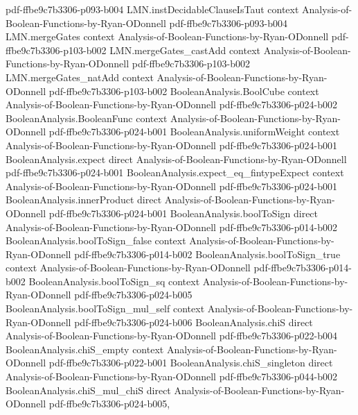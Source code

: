\begin{lemma}
  {pdf-ffbe9c7b3306-p093-b004}
\proofstep
  {LMN.instDecidableClauseIsTaut}
  {context}
  {Analysis-of-Boolean-Functions-by-Ryan-ODonnell}
  {pdf-ffbe9c7b3306-p093-b004}
\proofstep
  {LMN.mergeGates}
  {context}
  {Analysis-of-Boolean-Functions-by-Ryan-ODonnell}
  {pdf-ffbe9c7b3306-p103-b002}
\proofstep
  {LMN.mergeGates_castAdd}
  {context}
  {Analysis-of-Boolean-Functions-by-Ryan-ODonnell}
  {pdf-ffbe9c7b3306-p103-b002}
\proofstep
  {LMN.mergeGates_natAdd}
  {context}
  {Analysis-of-Boolean-Functions-by-Ryan-ODonnell}
  {pdf-ffbe9c7b3306-p103-b002}
\proofstep
  {BooleanAnalysis.BoolCube}
  {context}
  {Analysis-of-Boolean-Functions-by-Ryan-ODonnell}
  {pdf-ffbe9c7b3306-p024-b002}
\proofstep
  {BooleanAnalysis.BooleanFunc}
  {context}
  {Analysis-of-Boolean-Functions-by-Ryan-ODonnell}
  {pdf-ffbe9c7b3306-p024-b001}
\proofstep
  {BooleanAnalysis.uniformWeight}
  {context}
  {Analysis-of-Boolean-Functions-by-Ryan-ODonnell}
  {pdf-ffbe9c7b3306-p024-b001}
\proofstep
  {BooleanAnalysis.expect}
  {direct}
  {Analysis-of-Boolean-Functions-by-Ryan-ODonnell}
  {pdf-ffbe9c7b3306-p024-b001}
\proofstep
  {BooleanAnalysis.expect_eq_fintypeExpect}
  {context}
  {Analysis-of-Boolean-Functions-by-Ryan-ODonnell}
  {pdf-ffbe9c7b3306-p024-b001}
\proofstep
  {BooleanAnalysis.innerProduct}
  {direct}
  {Analysis-of-Boolean-Functions-by-Ryan-ODonnell}
  {pdf-ffbe9c7b3306-p024-b001}
\proofstep
  {BooleanAnalysis.boolToSign}
  {direct}
  {Analysis-of-Boolean-Functions-by-Ryan-ODonnell}
  {pdf-ffbe9c7b3306-p014-b002}
\proofstep
  {BooleanAnalysis.boolToSign_false}
  {context}
  {Analysis-of-Boolean-Functions-by-Ryan-ODonnell}
  {pdf-ffbe9c7b3306-p014-b002}
\proofstep
  {BooleanAnalysis.boolToSign_true}
  {context}
  {Analysis-of-Boolean-Functions-by-Ryan-ODonnell}
  {pdf-ffbe9c7b3306-p014-b002}
\proofstep
  {BooleanAnalysis.boolToSign_sq}
  {context}
  {Analysis-of-Boolean-Functions-by-Ryan-ODonnell}
  {pdf-ffbe9c7b3306-p024-b005}
\proofstep
  {BooleanAnalysis.boolToSign_mul_self}
  {context}
  {Analysis-of-Boolean-Functions-by-Ryan-ODonnell}
  {pdf-ffbe9c7b3306-p024-b006}
\proofstep
  {BooleanAnalysis.chiS}
  {direct}
  {Analysis-of-Boolean-Functions-by-Ryan-ODonnell}
  {pdf-ffbe9c7b3306-p022-b004}
\proofstep
  {BooleanAnalysis.chiS_empty}
  {context}
  {Analysis-of-Boolean-Functions-by-Ryan-ODonnell}
  {pdf-ffbe9c7b3306-p022-b001}
\proofstep
  {BooleanAnalysis.chiS_singleton}
  {direct}
  {Analysis-of-Boolean-Functions-by-Ryan-ODonnell}
  {pdf-ffbe9c7b3306-p044-b002}
\proofstep
  {BooleanAnalysis.chiS_mul_chiS}
  {direct}
  {Analysis-of-Boolean-Functions-by-Ryan-ODonnell}
  {pdf-ffbe9c7b3306-p024-b005,
}
\end{lemma}
